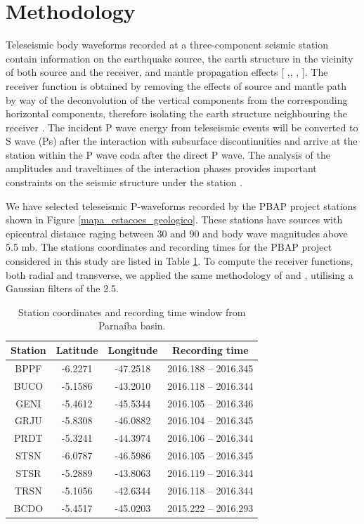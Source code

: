 \documentclass[paper,11pt]{geophysics}
\begin{document}
\section{Methodology}

Teleseismic body waveforms recorded at a three-component seismic station contain information on the earthquake source, the earth structure in the vicinity of both source and the receiver, and mantle propagation effects [\cite{langston_structure_1979} ,\cite{ammon_isolation_1991}, \cite{cassidy_numerical_1992}, \cite{ligorria_iterative_1999}]. The receiver function is obtained by removing the effects of source and mantle path by way of the deconvolution of the vertical components from the corresponding horizontal components, therefore isolating the earth structure neighbouring the receiver \citep{ligorria_iterative_1999}. The incident P wave energy from teleseismic events will be converted to S wave (Ps) after the interaction with subsurface discontinuities and arrive at the station within the P wave coda after the direct P wave. The analysis of the amplitudes and traveltimes of the interaction phases provides important constraints on the seismic structure under the station \citep{zhu_moho_2000}.

We have selected teleseismic P-waveforms recorded by the PBAP project stations shown in Figure \ref{mapa_estacoes_geologico}. These stations have sources with epicentral distance raging between 30 and 90 and body wave magnitudes above 5.5 mb. The stations coordinates and recording times for the PBAP project considered in this study are listed in Table \ref{tabela_estacoes}. To compute the receiver functions, both radial and transverse, we applied the same methodology of \cite{julia_deep_2008} and \cite{luz_bulk_2015}, utilising a Gaussian filters of the 2.5.

\begin{table}[! htpb]
\centering
	\small
	\begin{threeparttable}
	\caption{Station coordinates and recording time window from Parnaíba basin.}
	\begin{tabular}{c c c c}
    \hline
    Station & Latitude & Longitude & Recording time \\ \hline
    BPPF & -6.2271 & -47.2518 & 2016.188 – 2016.345 \\
	BUCO & -5.1586 & -43.2010 & 2016.118 – 2016.344 \\
	GENI & -5.4612 & -45.5344 & 2016.105 – 2016.346 \\
	GRJU & -5.8308 & -46.0882 & 2016.104 – 2016.345 \\
	PRDT & -5.3241 & -44.3974 & 2016.106 – 2016.344 \\
	STSN & -6.0787 & -46.5986 & 2016.105 – 2016.345 \\
	STSR & -5.2889 & -43.8063 & 2016.119 – 2016.344 \\
	TRSN & -5.1056 & -42.6344 & 2016.118 – 2016.344 \\
	BCDO & -5.4517 & -45.0203 & 2015.222 – 2016.293 \\ \hline
    \end{tabular}
    \label{tabela_estacoes}
	\end{threeparttable}
\end{table}
\end{document}
